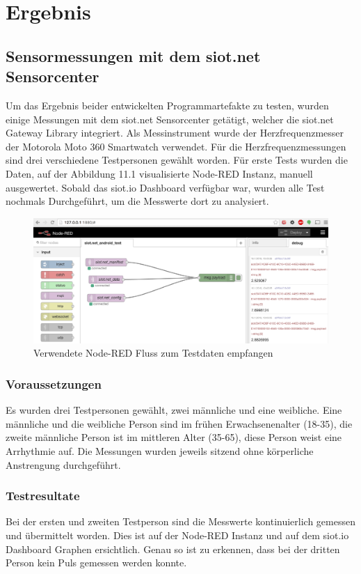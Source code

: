 \chapter{Ergebnis}
\section{Sensormessungen mit dem siot.net Sensorcenter}
Um das Ergebnis beider entwickelten Programmartefakte zu testen, wurden einige Messungen mit dem siot.net Sensorcenter getätigt, welcher die siot.net Gateway Library integriert. Als Messinstrument wurde der Herzfrequenzmesser der Motorola Moto 360 Smartwatch verwendet. Für die Herzfrequenzmessungen sind drei verschiedene Testpersonen gewählt worden. Für erste Tests wurden die Daten, auf der Abbildung 11.1 visualisierte Node-RED Instanz, manuell ausgewertet. Sobald das siot.io Dashboard verfügbar war, wurden alle Test nochmals Durchgeführt, um die Messwerte dort zu analysiert.
\begin{figure}[H]
  \centering
  \includegraphics[scale=0.4]{98_Bilder/11_Ergebnis/nodeRED}
  \caption[Node-RED Testflow]{Verwendete Node-RED Fluss zum Testdaten empfangen}
\end{figure}
\subsection{Voraussetzungen}
Es wurden drei Testpersonen gewählt, zwei männliche und eine weibliche. Eine männliche und die weibliche Person sind im frühen Erwachsenenalter (18-35), die zweite männliche Person ist im mittleren Alter (35-65), diese Person weist eine Arrhythmie auf. Die Messungen wurden jeweils sitzend ohne körperliche Anstrengung durchgeführt.
\subsection{Testresultate}
Bei der ersten und zweiten Testperson sind die Messwerte kontinuierlich gemessen und übermittelt worden. Dies ist auf der Node-RED Instanz und auf dem siot.io Dashboard Graphen ersichtlich. Genau so ist zu erkennen, dass bei der dritten Person kein Puls gemessen werden konnte.
